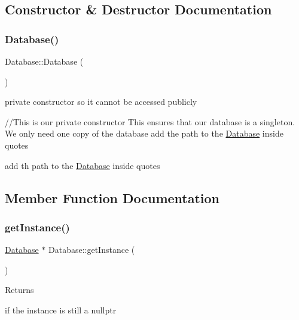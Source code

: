 \subsection{Constructor \& Destructor Documentation}
\mbox{\label{class_database_a4703c80e6969d33565ea340f768fdadf}} 
\subsubsection{\texorpdfstring{Database()}{Database()}}
{\footnotesize\ttfamily Database\+::\+Database (\begin{DoxyParamCaption}{ }\end{DoxyParamCaption})\hspace{0.3cm}{\ttfamily [private]}}

private constructor so it cannot be accessed publicly

//\+This is our private constructor This ensures that our database is a singleton. We only need one copy of the database add the path to the \hyperlink{class_database}{Database} inside quotes

add th path to the \hyperlink{class_database}{Database} inside quotes 

\subsection{Member Function Documentation}
\mbox{\label{class_database_a5a3b028f980a577ea0b809eb92312761}} 
\subsubsection{\texorpdfstring{get\+Instance()}{getInstance()}}
{\footnotesize\ttfamily \hyperlink{class_database}{Database} $\ast$ Database\+::get\+Instance (\begin{DoxyParamCaption}{ }\end{DoxyParamCaption})\hspace{0.3cm}{\ttfamily [static]}}


\begin{DoxyItemize}
\item \begin{DoxyReturn}{Returns}

\end{DoxyReturn}

\end{DoxyItemize}if the instance is still a nullptr

